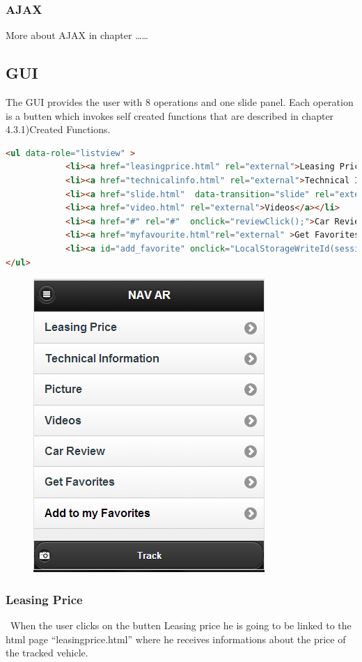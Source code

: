 \subsubsection{AJAX}
More about AJAX in chapter ……
\\

\subsection{GUI}
The GUI provides the user with 8 operations and one slide panel. Each operation is a butten which invokes self created functions that are described in chapter 4.3.1)Created Functions.
\\
\begin{lstlisting}[language=html, caption= 
start timer function,captionpos=b]
<ul data-role="listview" >	
            <li><a href="leasingprice.html" rel="external">Leasing Price</a></li>
            <li><a href="technicalinfo.html" rel="external">Technical Information</a></li>
            <li><a href="slide.html"  data-transition="slide" rel="external">Picture</a></li>
            <li><a href="video.html" rel="external">Videos</a></li>
            <li><a href="#" rel="#"  onclick="reviewClick();">Car Review</a></li>
            <li><a href="myfavourite.html"rel="external" >Get Favorites</a></li>
			<li><a id="add_favorite" onclick="LocalStorageWriteId(sessionStorage.getItem('id'),globalcarname);" style="color:red" rel="external" >Add to my Favorites</a></li>
</ul>
\end{lstlisting}


\begin{figure}[b]
\centering
\includegraphics[width=0.4\linewidth]{graphics/chapter4/4}
\caption{}
\label{fig:5}
\end{figure}
\newpage

\subsubsection{Leasing Price}
\
When the user clicks on the butten Leasing price he is going to be linked to the html page “leasingprice.html” where he receives informations about the price of the tracked vehicle.


